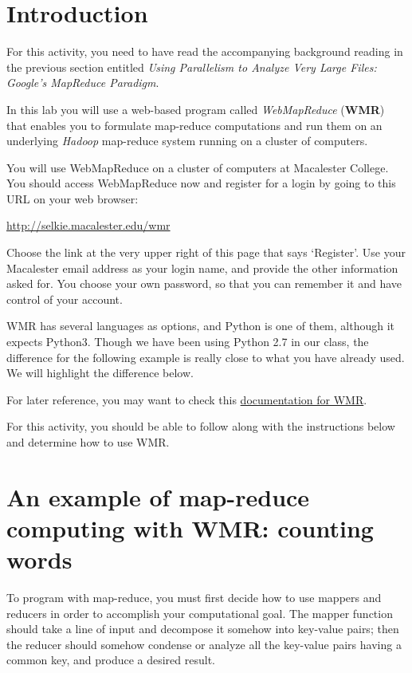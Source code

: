 \documentclass[letterpaper,10pt,openany,oneside]{sphinxmanual}
\begin{document}
\section{Introduction}
\label{wmr_py/wmr_py:introduction}
For this activity, you need to have read the accompanying
background reading in the previous section entitled
\emph{Using Parallelism to Analyze Very Large Files: Google's MapReduce Paradigm}.

In this lab you will use a web-based program called \emph{WebMapReduce}
(\textbf{WMR}) that enables you to formulate map-reduce computations and
run them on an underlying \emph{Hadoop} map-reduce system running on a
cluster of computers.

You will use WebMapReduce on a cluster of computers at Macalester
College. You should access WebMapReduce now and register for a
login by going to this URL on your web browser:

\href{http://selkie.macalester.edu/wmr}{http://selkie.macalester.edu/wmr}

Choose the link at the very upper right of this page that says
`Register'. Use your Macalester email address as your login name,
and provide the other information asked for. You choose your own
password, so that you can remember it and have control of your
account.

WMR has several languages as options, and Python is one of them,
although it expects Python3. Though we have been using Python 2.7
in our class, the difference for the following example is really
close to what you have already used. We will highlight the
difference below.

For later reference, you may want to check this \href{http://webmapreduce.sourceforge.net/docs/using/index.html}{documentation for
WMR}.

For this activity, you should be able to follow along with the
instructions below and determine how to use WMR.


\section{An example of map-reduce computing with WMR: counting words}
\label{wmr_py/wmr_py:an-example-of-map-reduce-computing-with-wmr-counting-words}
To program with map-reduce, you must first decide how to use
mappers and reducers in order to accomplish your computational
goal. The mapper function should take a line of input and decompose
it somehow into key-value pairs; then the reducer should somehow
condense or analyze all the key-value pairs having a common key,
and produce a desired result.
\end{document}
